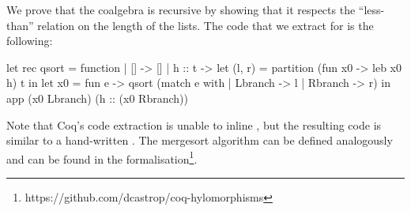 \documentclass{llncs}
\begin{document}
We prove that the coalgebra  is recursive by showing
that it respects the ``less-than'' relation on the length of the lists.
%
The code that we extract for  is the following:
\begin{ocamlcode}
let rec qsort = function
| [] -> [] | h :: t ->
  let (l, r) = partition (fun x0 -> leb x0 h) t in
  let x0 = fun e -> qsort (match e with | Lbranch -> l | Rbranch -> r) in
  app (x0 Lbranch) (h :: (x0 Rbranch))
\end{ocamlcode}
Note that Coq's code extraction is unable to inline , but the resulting
code is similar to a hand-written .
The mergesort algorithm can be defined analogously and can be found in the
formalisation\footnote{https://github.com/dcastrop/coq-hylomorphisms}. %



\end{document}
